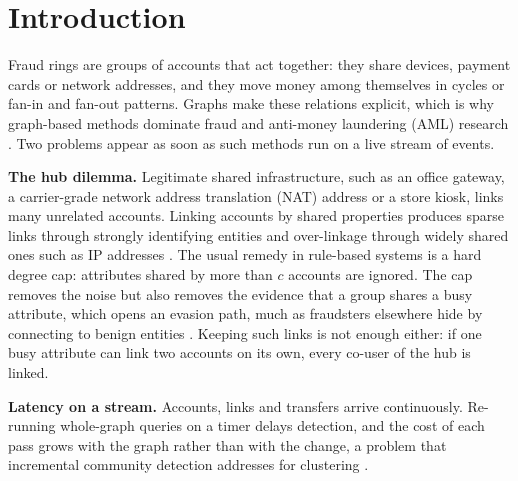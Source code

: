 \section{Introduction}
Fraud rings are groups of accounts that act together: they share devices,
payment cards or network addresses, and they move money among themselves in
cycles or fan-in and fan-out patterns. Graphs make these relations explicit,
which is why graph-based methods dominate fraud and anti-money laundering
(AML) research \cite{pourhabibi2020fraud,pan2025gbfrd}. Two problems appear as
soon as such methods run on a live stream of events.

\textbf{The hub dilemma.} Legitimate shared infrastructure, such as an office
gateway, a carrier-grade network address translation (NAT) address or a store
kiosk, links many unrelated accounts. Linking accounts by shared properties
produces sparse links through strongly identifying entities and over-linkage
through widely shared ones such as IP addresses \cite{yin2022behavioral}. The
usual remedy in rule-based systems is a hard degree cap: attributes shared by
more than $c$ accounts are ignored. The cap removes the noise but also removes
the evidence that a group shares a busy attribute, which opens an evasion path,
much as fraudsters elsewhere hide by connecting to benign entities
\cite{liu2025robust}. Keeping such links is not enough either: if one busy
attribute can link two accounts on its own, every co-user of the hub is linked.

\textbf{Latency on a stream.} Accounts, links and transfers arrive
continuously. Re-running whole-graph queries on a timer delays detection, and
the cost of each pass grows with the graph rather than with the change, a
problem that incremental community detection addresses for clustering
\cite{zhang2026incremental,abughofa2021incremental}.

